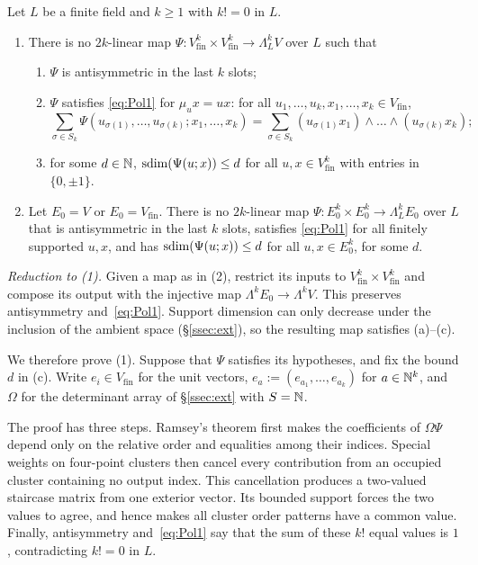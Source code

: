 \begin{samepage}
\begin{theorem}\label{thm:FF}
Let $L$ be a finite field and $k\ge1$ with $k!=0$ in $L$.
\begin{enumerate}
\item There is no $2k$\nobreakdash-linear map $\Psi\colon V_{\mathrm{fin}}^k\times V_{\mathrm{fin}}^k\to\Lambda^k_LV$ over $L$ such that
\begin{enumerate}
\item $\Psi$ is antisymmetric in the last $k$ slots;
\item $\Psi$ satisfies \eqref{eq:Pol1} for $\mu_ux=ux$: for all $u_1,\dots,u_k,x_1,\dots,x_k\in V_{\mathrm{fin}}$,
\[
\sum_{\sigma\in S_k}\Psi(u_{\sigma(1)},\dots,u_{\sigma(k)};x_1,\dots,x_k)=\sum_{\sigma\in S_k}(u_{\sigma(1)}x_1)\wedge\dots\wedge(u_{\sigma(k)}x_k);
\]
\item for some $d\in\mathbb N$, $\operatorname{sdim}(\Psi(u;x))\le d$ for all $u,x\in V_{\mathrm{fin}}^k$ with entries in $\{0,\pm1\}$.
\end{enumerate}
\item Let $E_0=V$ or $E_0=V_{\mathrm{fin}}$. There is no $2k$\nobreakdash-linear map $\Psi\colon E_0^k\times E_0^k\to\Lambda^k_LE_0$ over $L$
that is antisymmetric in the last $k$ slots, satisfies \eqref{eq:Pol1} for all finitely supported $u,x$, and has
$\operatorname{sdim}(\Psi(u;x))\le d$ for all $u,x\in E_0^k$, for some $d$.
\end{enumerate}
\end{theorem}
\end{samepage}

\emph{Reduction to (1).} Given a map as in (2), restrict its inputs to
$V_{\mathrm{fin}}^k\times V_{\mathrm{fin}}^k$ and compose its output with the injective map
$\Lambda^kE_0\to\Lambda^kV$. This preserves antisymmetry and~\eqref{eq:Pol1}. Support dimension can only decrease under
the inclusion of the ambient space (\S\ref{ssec:ext}), so the resulting map satisfies (a)--(c).

We therefore prove (1). Suppose that $\Psi$ satisfies its hypotheses, and fix the bound $d$ in (c). Write
$e_i\in V_{\mathrm{fin}}$ for the unit vectors, $e_a:=(e_{a_1},\dots,e_{a_k})$ for $a\in\mathbb N^k$, and $\Omega$ for the
determinant array of \S\ref{ssec:ext} with $S=\mathbb N$.

The proof has three steps. Ramsey's theorem first makes the coefficients of $\Omega\Psi$ depend only on the relative
order and equalities among their indices. Special weights on four-point clusters then cancel every contribution
from an occupied cluster containing no output index. This cancellation produces a two-valued staircase matrix from
one exterior vector. Its bounded support forces the two values to agree, and hence makes all cluster order patterns
have a common value. Finally, antisymmetry and~\eqref{eq:Pol1} say that the sum of these $k!$ equal values is $1$,
contradicting $k!=0$ in $L$.

